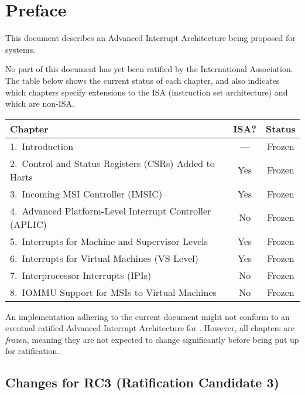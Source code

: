 
\chapter{Preface}

This document describes an Advanced Interrupt Architecture
being proposed for {\RISCV} systems.

No part of this document has yet been ratified
by the {\RISCV} International Association.
The table below shows the current status of each chapter,
and also indicates which chapters specify extensions to the
{\RISCV} ISA (instruction set architecture) and which are non-ISA.

{
\begin{table}[hbt]
\centering
\begin{tabular}{|l|c|c|}
\hline
Chapter                                                  & ISA? & Status \\
\hline
\hline
1.\ Introduction                                         & ---  & Frozen \\
2.\ Control and Status Registers (CSRs) Added to Harts   & Yes  & Frozen \\
3.\ Incoming MSI Controller (IMSIC)                      & Yes  & Frozen \\
4.\ Advanced Platform-Level Interrupt Controller (APLIC) & No   & Frozen \\
5.\ Interrupts for Machine and Supervisor Levels         & Yes  & Frozen \\
6.\ Interrupts for Virtual Machines (VS Level)           & Yes  & Frozen \\
7.\ Interprocessor Interrupts (IPIs)                     & No   & Frozen \\
8.\ IOMMU Support for MSIs to Virtual Machines           & No   & Frozen \\
\hline
\end{tabular}
\end{table}
}

An implementation adhering to the current document might not conform
to an eventual ratified Advanced Interrupt Architecture for {\RISCV}.
However, all chapters are \emph{frozen}, meaning they are not expected
to change significantly before being put up for ratification.

\section*{Changes for RC3 (Ratification Candidate 3)}

